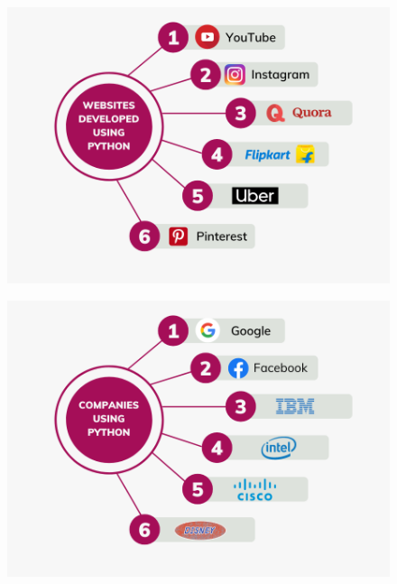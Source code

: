 \begin{flushleft}	
	\bigskip
	\bigskip
		\begin{figure}[h!]
			\centering
			\includegraphics[scale=0.6]{content/chapter0/images/pic1.png}
		\end{figure}		

		\begin{figure}[h!]
			\centering
			\includegraphics[scale=0.6]{content/chapter0/images/pic2.png}
		\end{figure}		
		

\end{flushleft}
